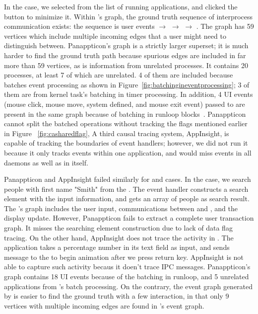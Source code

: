 In the  case, we selected  from the list of running
applications, and clicked the  button to minimize it. Within \xxx's
graph, the ground truth sequence of interprocess communication exists: the
sequence is  user events $\rightarrow$ 
$\rightarrow$  $\rightarrow$ . The graph
has 59 vertices which include multiple incoming edges that a user might need to
distinguish between. Panappticon's graph is a strictly larger superset; it is
much harder to find the ground truth path because spurious edges are included
in far more than 59 vertices, as is information from unrelated processes.
It contains 20 processes, at least 7 of which are unrelated. 4 of them are
included because  batches event processing as shown in
Figure~\ref{fig:batchingineventprocessing}; 3 of them are from kernel task's
batching in timer processing. In addition, 4 UI events (mouse click, mouse move,
system defined, and mouse exit event) passed to  are present in the
same graph because of batching in runloop blocks~\cite{runloop}. Panappticon
cannot split the batched operations without tracking the flags mentioned earlier
in Figure ~\ref{fig:casharedflag}, A third causal tracing system, AppInsight, is
capable of tracking the boundaries of event handlers; however, we did not run it
because it only tracks events within one application, and would miss events in
all daemons as well as in  itself. 

Panappticon and AppInsight failed similarly for  and
 cases. In the  case, we search people with
first name "Smith" from the . The event handler constructs a
search element with the input information, and gets an array of people as
search result. The \xxx's graph includes the user input, communications between
 and , and the display update. However, Panappticon fails
to extract a complete user transaction graph. It misses the searching element
construction due to lack of data flag tracing. On the other hand, AppInsight
does not trace the activity in . The application 
takes a percentage number in its text field as input, and sends message to the
 to begin animation after we press return key. AppInsight
is not able to capture such activity becaus it doen't trace IPC messages.
Panappticon's graph contains 18 UI events because of the batching in runloop,
and 5 unrelated applications from 's batch processing. On the
contrary, the event graph generated by \xxx is easier to find the ground truth
with a few interaction, in that only 9 vertices with multiple incoming edges are
found in \xxx's event graph.


